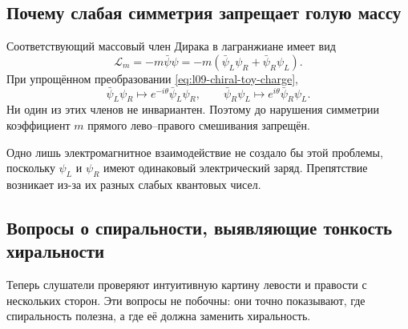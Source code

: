 \subsection{Почему слабая симметрия запрещает голую массу}

Соответствующий массовый член Дирака в лагранжиане имеет вид
\begin{equation}
  \mathcal L_m
  =-m\bar\psi\psi
  =-m\left(\bar\psi_L\psi_R+\bar\psi_R\psi_L\right).
  \label{eq:l09-bare-dirac-mass}
\end{equation}
При упрощённом преобразовании \eqref{eq:l09-chiral-toy-charge},
\begin{equation}
  \bar\psi_L\psi_R\longmapsto
  e^{-i\theta}\bar\psi_L\psi_R,
  \qquad
  \bar\psi_R\psi_L\longmapsto
  e^{i\theta}\bar\psi_R\psi_L.
\end{equation}
Ни один из этих членов не инвариантен. Поэтому до нарушения симметрии коэффициент \(m\) прямого лево--правого смешивания запрещён.

Одно лишь электромагнитное взаимодействие не создало бы этой проблемы, поскольку \(\psi_L\) и \(\psi_R\) имеют одинаковый электрический заряд. Препятствие возникает из-за их разных слабых квантовых чисел.

\subsection{Вопросы о спиральности, выявляющие тонкость хиральности}

Теперь слушатели проверяют интуитивную картину левости и правости с нескольких сторон. Эти вопросы не побочны: они точно показывают, где спиральность полезна, а где её должна заменить хиральность.

\begin{classroomqa}
\end{classroomqa}

\begin{classroomqa}
\end{classroomqa}

